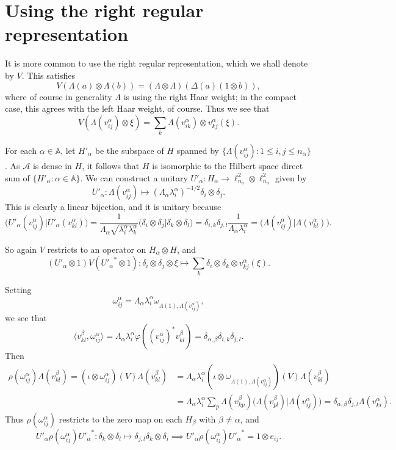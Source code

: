 \documentclass[twoside,a4paper,12pt]{article}
\theoremstyle{plain}
\theoremstyle{definition}
\newcommand{\ip}[2]{\langle #1,#2 \rangle}
\newcommand{\mc}{\mathcal}
\begin{document}
\section{Using the right regular representation}

It is more common to use the right regular representation, which we
shall denote by $V$.  This satisfies
\[ V(\Lambda(a) \otimes \Lambda(b)) = (\Lambda\otimes\Lambda)
(\Delta(a)(1\otimes b)), \]
where of course in generality $\Lambda$ is using the right Haar weight;
in the compact case, this agrees with the left Haar weight, of course.
Thus we see that
\[ V(\Lambda(v^\alpha_{ij}) \otimes \xi) = \sum_k \Lambda(v^\alpha_{ik})
\otimes v^\alpha_{kj}(\xi). \]

For each $\alpha\in\mathbb A$, let $H'_\alpha$ be the subspace of $H$
spanned by $\{ \Lambda(v^\alpha_{ij}) : 1\leq i,j\leq n_\alpha \}$.
As $\mc A$ is dense in $H$, it follows that $H$ is isomorphic to the Hilbert
space direct sum of $\{ H'_\alpha : \alpha\in\mathbb A \}$.  We can construct
a unitary $U'_\alpha: H_\alpha \rightarrow \ell^2_{n_\alpha} \otimes
\ell^2_{n_\alpha}$ given by
\[ U'_\alpha : \Lambda(v^\alpha_{ij}) \mapsto
(\Lambda_\alpha \lambda^\alpha_i)^{-1/2} \delta_i \otimes \delta_j. \]
This is clearly a linear bijection, and it is unitary because
\[ \big( U'_\alpha(v^\alpha_{ij}) \big| U'_\alpha(v^\alpha_{kl}) \big)
= \frac{1}{\Lambda_\alpha \sqrt{\lambda^\alpha_i \lambda^\alpha_k}}
\big( \delta_i\otimes\delta_j \big| \delta_k\otimes\delta_l \big)
= \delta_{i,k} \delta_{j,l} \frac{1}{\Lambda_\alpha \lambda^\alpha_i}
= \big( \Lambda(v^\alpha_{ij}) \big| \Lambda(v^\alpha_{kl}) \big). \]

So again $V$ restricts to an operator on $H_\alpha \otimes H$, and
\[ (U'_\alpha\otimes 1) V ({U'_\alpha}^*\otimes 1)
: \delta_i \otimes \delta_j \otimes \xi \mapsto
\sum_k \delta_i \otimes \delta_k \otimes v^\alpha_{kj}(\xi). \]

Setting
\[ \omega^\alpha_{ij} = \Lambda_\alpha \lambda^\alpha_i
\omega_{\Lambda(1), \Lambda(v^\alpha_{ij})}, \]
we see that
\[ \ip{v^\beta_{kl}}{\omega^\alpha_{ij}}
= \Lambda_\alpha \lambda^\alpha_i \varphi( (v^\alpha_{ij})^* v^\beta_{kl} )
= \delta_{\alpha,\beta} \delta_{i,k} \delta_{j,l}. \]
Then
\begin{align*}
\rho(\omega^\alpha_{ij}) \Lambda(v^\beta_{kl}) =
(\iota\otimes\omega^\alpha_{ij})(V) \Lambda(v^\beta_{kl})
&= \Lambda_\alpha \lambda^\alpha_i
(\iota\otimes\omega_{\Lambda(1), \Lambda(v^\alpha_{ij})})(V) 
\Lambda(v^\beta_{kl}) \\
&= \Lambda_\alpha \lambda^\alpha_i \sum_p
\Lambda(v^\beta_{kp}) \big( \Lambda(v^\beta_{pl}) \big|
   \Lambda(v^\alpha_{ij}) \big)
= \delta_{\alpha,\beta} \delta_{j,l} \Lambda(v^\alpha_{ki}).
\end{align*}
Thus $\rho(\omega^\alpha_{ij})$ restricts to the zero map on each $H_\beta$
with $\beta\not=\alpha$, and
\[ U'_\alpha \rho(\omega^\alpha_{ij}) {U'_\alpha}^* : \delta_k\otimes\delta_l
\mapsto \delta_{j,l} \delta_k \otimes \delta_i
\implies U'_\alpha \rho(\omega^\alpha_{ij}) {U'_\alpha}^* = 1\otimes e_{ij}. \]
\end{document}
